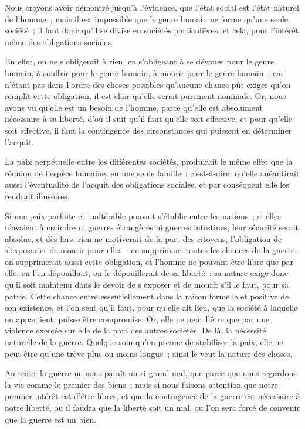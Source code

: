 \documentclass[french,twoside]{book} %
\newcommand\chaptercont{} %
\begin{document}
\chaptercont
\noindent Nous croyons avoir démontré jusqu’à l’évidence, que l’état social est l’état naturel de l’homme ; mais il est impossible que le genre humain ne forme qu’une seule société ; il faut donc qu’il se divise en sociétés particulières, et cela, pour l’intérêt même des obligations sociales.\par
En effet, on ne s’obligerait à rien, en s’obligeant à se dévouer pour le genre humain, à souffrir pour le genre humain, à mourir pour le genre humain ; car n’étant pas dans l’ordre des choses possibles qu’aucune chance pût exiger qu’on remplît cette obligation, il est clair qu’elle serait purement nominale. Or, nous avons vu qu’elle est un besoin de l’homme, parce qu’elle est absolument nécessaire à sa liberté, d’où il suit qu’il faut qu’elle soit effective, et pour qu’elle soit effective, il faut la contingence des circonstances qui puissent en déterminer l’acquit.\par
La paix perpétuelle entre les différentes sociétés, produirait le même effet que la réunion de l’espèce humaine, en une seule famille ; c’est-à-dire, qu’elle anéantirait aussi l’éventualité de l’acquit des obligations sociales, et par conséquent elle les rendrait illusoires.\par
Si une paix parfaite et inaltérable pouvait s’établir entre les nations ; si elles n’avaient à craindre ni guerres étrangères ni guerres intestines, leur sécurité serait absolue, et dès lors, rien ne motiverait de la part des citoyens, l’obligation de s’exposer et de mourir pour elles : en supprimant toutes les chances de la guerre, on supprimerait aussi cette obligation, et l’homme ne pouvant être libre que par elle, en l’en dépouillant, on le dépouillerait de sa liberté : sa nature exige donc qu’il soit maintenu dans le devoir de s’exposer et de mourir s’il le faut, pour sa patrie. Cette chance entre essentiellement dans la raison formelle et positive de son existence, et l’on sent qu’il faut, pour qu’elle ait lieu, que la société à laquelle on appartient, puisse être compromise. Or, elle ne peut l’être que par une violence exercée sur elle de la part des autres sociétés. De là, la nécessité naturelle de la guerre. Quelque soin qu’on prenne de stabiliser la paix, elle ne peut être qu’une trêve plus ou moins longue ; ainsi le veut la nature des choses.\par
Au reste, la guerre ne nous paraît un si grand mal, que parce que nous regardons la vie comme le premier des biens ; mais si nous faisons attention que notre premier intérêt est d’être libres, et que la contingence de la guerre est nécessaire à notre liberté, ou il faudra que la liberté soit un mal, ou l’on sera forcé de convenir que la guerre est un bien.\par
\end{document}
